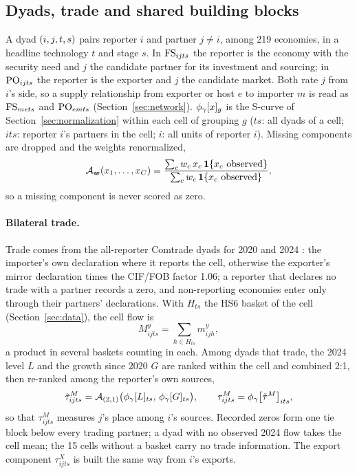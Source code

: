 \subsection{Dyads, trade and shared building blocks}\label{subsec:bilateral_dyads}

A dyad $(i,j,t,s)$ pairs reporter $i$ and partner $j\neq i$, among 219 economies, in a headline
technology $t$ and stage $s$. In $\mathrm{FS}_{ijts}$ the reporter is the economy with the security need and $j$ the
candidate partner for its investment and sourcing; in $\mathrm{PO}_{ijts}$ the reporter is the exporter and
$j$ the candidate market. Both rate $j$ from $i$'s side, so a supply relationship from exporter or host $e$ to importer $m$ is
read as $\mathrm{FS}_{mets}$ and $\mathrm{PO}_{emts}$ (Section~\ref{sec:network}). ${\phi_{\gamma}}[x]_{g}$ is the S-curve of
Section~\ref{sec:normalization} within each cell of grouping $g$ ($ts$: all dyads of a cell; $its$:
reporter $i$'s partners in the cell; $i$: all units of reporter $i$). Missing components are dropped
and the weights renormalized,
\begin{equation}\label{eq:bilateral_acmean}
  \mathcal{A}_{\bm w}(x_1,\dots,x_C)=\frac{\sum_{c} w_c\,x_c\,\1\{x_c\ \text{observed}\}}
  {\sum_{c} w_c\,\1\{x_c\ \text{observed}\}},
\end{equation}
so a missing component is never scored as zero.

\paragraph{Bilateral trade.}\label{subsec:bilateral_blocks} Trade comes from the all-reporter
Comtrade dyads for 2020 and 2024 \citep{uncomtrade}: the importer's own declaration where it reports
the cell, otherwise the exporter's mirror declaration times the CIF/FOB factor 1.06; a reporter that
declares no trade with a partner records a zero, and non-reporting economies enter only through
their partners' declarations. With $H_{ts}$ the HS6 basket of the cell (Section~\ref{sec:data}),
the cell flow is
\begin{equation}\label{eq:bilateral_trade_value}
  M^{y}_{ijts}=\sum_{h\in H_{ts}} m^{y}_{ijh},
\end{equation}
a product in several baskets counting in each. Among dyads that trade, the 2024 level $L$ and the
growth since 2020 $G$ are ranked within the cell and combined 2:1, then re-ranked among the
reporter's own sources,
\begin{equation}\label{eq:bilateral_trade_index}
  \tilde\tau^{M}_{ijts}=\mathcal{A}_{(2,1)}\bigl({\phi_{\gamma}}[L]_{ts},\,{\phi_{\gamma}}[G]_{ts}\bigr),
  \qquad
  \tau^{M}_{ijts}={\phi_{\gamma}}\bigl[\tilde\tau^{M}\bigr]_{its},
\end{equation}
so that $\tau^{M}_{ijts}$ measures $j$'s place among $i$'s sources. Recorded zeros form one tie block
below every trading partner; a dyad with no observed 2024 flow takes the cell mean; the 15 cells
without a basket carry no trade information. The export component $\tau^{X}_{ijts}$ is built the
same way from $i$'s exports.

